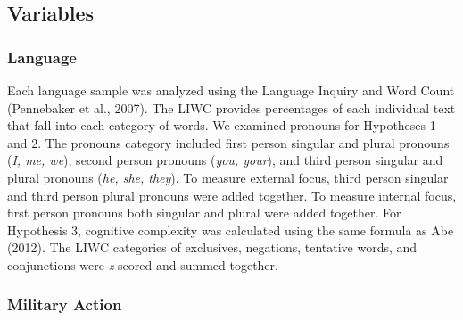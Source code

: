\documentclass[
  english,
  ,man,floatsintext]{apa6}
\begin{document}
\hypertarget{variables}{%
\subsection{Variables}\label{variables}}

\hypertarget{language}{%
\subsubsection{Language}\label{language}}

Each language sample was analyzed using the Language Inquiry and Word Count (Pennebaker et al., 2007). The LIWC provides percentages of each individual text that fall into each category of words. We examined pronouns for Hypotheses 1 and 2. The pronouns category included first person singular and plural pronouns (\emph{I, me, we}), second person pronouns (\emph{you, your}), and third person singular and plural pronouns (\emph{he, she, they}). To measure external focus, third person singular and third person plural pronouns were added together. To measure internal focus, first person pronouns both singular and plural were added together. For Hypothesis 3, cognitive complexity was calculated using the same formula as Abe (2012). The LIWC categories of exclusives, negations, tentative words, and conjunctions were \emph{z}-scored and summed together.

\hypertarget{military-action}{%
\subsubsection{Military Action}\label{military-action}}
\end{document}
